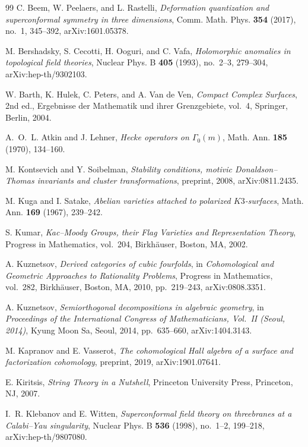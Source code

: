 \begin{thebibliography}{99}
C. Beem, W. Peelaers, and L. Rastelli, \emph{Deformation quantization and superconformal symmetry in three dimensions}, Comm. Math. Phys. \textbf{354} (2017), no.~1, 345--392, arXiv:1601.05378.

M. Bershadsky, S. Cecotti, H. Ooguri, and C. Vafa, \emph{Holomorphic anomalies in topological field theories}, Nuclear Phys. B \textbf{405} (1993), no.~2--3, 279--304, arXiv:hep-th/9302103.

W. Barth, K. Hulek, C. Peters, and A. Van de Ven, \emph{Compact Complex Surfaces}, 2nd ed., Ergebnisse der Mathematik und ihrer Grenzgebiete, vol.~4, Springer, Berlin, 2004.

A.~O.~L. Atkin and J. Lehner, \emph{Hecke operators on $\Gamma_0(m)$}, Math. Ann. \textbf{185} (1970), 134--160.

M. Kontsevich and Y. Soibelman, \emph{Stability conditions, motivic Donaldson--Thomas invariants and cluster transformations}, preprint, 2008, arXiv:0811.2435.

M. Kuga and I. Satake, \emph{Abelian varieties attached to polarized $K3$-surfaces}, Math. Ann. \textbf{169} (1967), 239--242.

S. Kumar, \emph{Kac--Moody Groups, their Flag Varieties and Representation Theory}, Progress in Mathematics, vol.~204, Birkh\"auser, Boston, MA, 2002.

A. Kuznetsov, \emph{Derived categories of cubic fourfolds}, in \emph{Cohomological and Geometric Approaches to Rationality Problems}, Progress in Mathematics, vol.~282, Birkh\"auser, Boston, MA, 2010, pp.~219--243, arXiv:0808.3351.

A. Kuznetsov, \emph{Semiorthogonal decompositions in algebraic geometry}, in \emph{Proceedings of the International Congress of Mathematicians, Vol.\ II (Seoul, 2014)}, Kyung Moon Sa, Seoul, 2014, pp.~635--660, arXiv:1404.3143.

M. Kapranov and E. Vasserot, \emph{The cohomological Hall algebra of a surface and factorization cohomology}, preprint, 2019, arXiv:1901.07641.

E. Kiritsis, \emph{String Theory in a Nutshell}, Princeton University Press, Princeton, NJ, 2007.

I.~R. Klebanov and E. Witten, \emph{Superconformal field theory on threebranes at a Calabi--Yau singularity}, Nuclear Phys. B \textbf{536} (1998), no.~1--2, 199--218, arXiv:hep-th/9807080.


\end{thebibliography}
